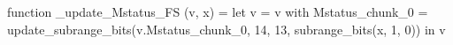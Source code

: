 function _update_Mstatus_FS (v, x) = let v = { v with Mstatus_chunk_0 = update_subrange_bits(v.Mstatus_chunk_0, 14, 13, subrange_bits(x, 1, 0)) } in
  v
